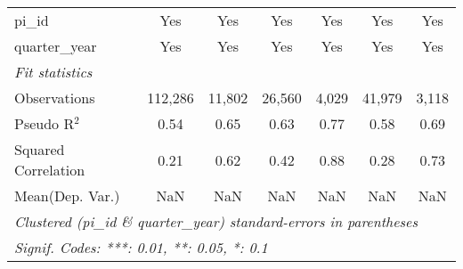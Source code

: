\begin{tabular}{lcccccc}
   pi\_id                                                     & Yes           & Yes           & Yes            & Yes           & Yes           & Yes\\  
   quarter\_year                                              & Yes           & Yes           & Yes            & Yes           & Yes           & Yes\\  
   \midrule
   \emph{Fit statistics}\\
   Observations                                               & 112,286       & 11,802        & 26,560         & 4,029         & 41,979        & 3,118\\  
   Pseudo R$^2$                                               & 0.54          & 0.65          & 0.63           & 0.77          & 0.58          & 0.69\\  
   Squared Correlation                                        & 0.21          & 0.62          & 0.42           & 0.88          & 0.28          & 0.73\\  
Mean(Dep. Var.) & NaN & NaN & NaN & NaN & NaN & NaN \\
   \midrule \midrule
   \multicolumn{7}{l}{\emph{Clustered (pi\_id \& quarter\_year) standard-errors in parentheses}}\\
   \multicolumn{7}{l}{\emph{Signif. Codes: ***: 0.01, **: 0.05, *: 0.1}}\\
\end{tabular}
\par\endgroup
